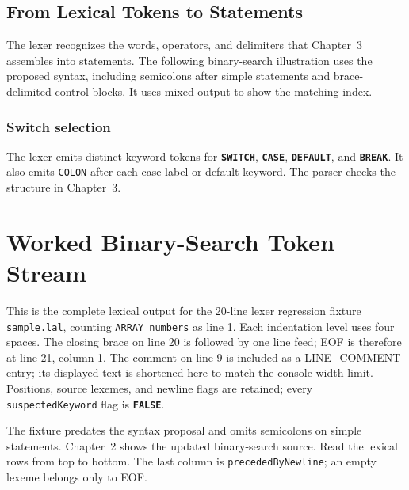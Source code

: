 \documentclass[11pt,a4paper]{article}
\newcommand{\kw}[1]{\texttt{\bfseries\color{pupmaroon}#1}}
\newcommand{\token}[1]{\texttt{#1}}
\newcommand{\codeinline}[1]{\texttt{#1}}
\begin{document}
\subsection{From Lexical Tokens to Statements}

The lexer recognizes the words, operators, and delimiters that Chapter~3 assembles into statements. The following binary-search illustration uses the proposed syntax, including semicolons after simple statements and brace-delimited control blocks. It uses mixed output to show the matching index.



\subsubsection{Switch selection}
The lexer emits distinct keyword tokens for \kw{SWITCH}, \kw{CASE}, \kw{DEFAULT}, and \kw{BREAK}. It also emits \token{COLON} after each case label or default keyword. The parser checks the structure in Chapter~3.





\clearpage
\appendix
\section{Worked Binary-Search Token Stream}

This is the complete lexical output for the 20-line lexer regression fixture \codeinline{sample.lal}, counting \codeinline{ARRAY numbers} as line 1. Each indentation level uses four spaces. The closing brace on line 20 is followed by one line feed; EOF is therefore at line 21, column 1. The comment on line 9 is included as a LINE\_COMMENT entry; its displayed text is shortened here to match the console-width limit. Positions, source lexemes, and newline flags are retained; every \codeinline{suspectedKeyword} flag is \kw{FALSE}.

The fixture predates the syntax proposal and omits semicolons on simple statements. Chapter~2 shows the updated binary-search source. Read the lexical rows from top to bottom. The last column is \codeinline{precededByNewline}; an empty lexeme belongs only to EOF.
\end{document}
